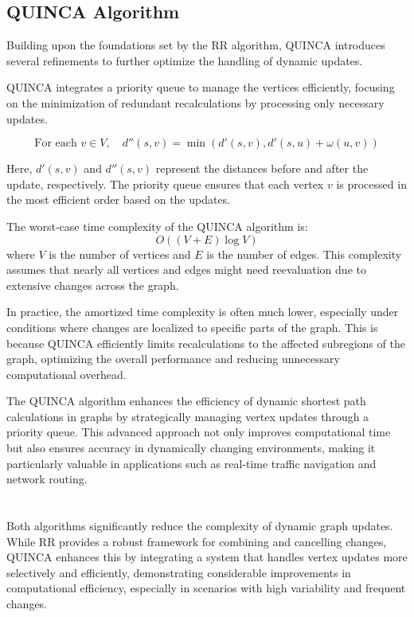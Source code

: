 \documentclass[conference]{IEEEtran}
\begin{document}
\subsection{QUINCA Algorithm}
Building upon the foundations set by the RR algorithm, QUINCA \cite{Slobbe2016FasterIA} introduces several refinements to further optimize the handling of dynamic updates.

QUINCA integrates a priority queue to manage the vertices efficiently, focusing on the minimization of redundant recalculations by processing only necessary updates.

\[
\text{For each } v \in V, \quad d''(s, v) = \min(d'(s, v), d'(s, u) + \omega(u, v))
\]

Here, \( d'(s, v) \) and \( d''(s, v) \) represent the distances before and after the update, respectively. The priority queue ensures that each vertex \( v \) is processed in the most efficient order based on the updates.

The worst-case time complexity of the QUINCA algorithm is:
\[
O((V + E) \log V)
\]
where \(V\) is the number of vertices and \(E\) is the number of edges. This complexity assumes that nearly all vertices and edges might need reevaluation due to extensive changes across the graph.

In practice, the amortized time complexity is often much lower, especially under conditions where changes are localized to specific parts of the graph. This is because QUINCA efficiently limits recalculations to the affected subregions of the graph, optimizing the overall performance and reducing unnecessary computational overhead.

The QUINCA algorithm enhances the efficiency of dynamic shortest path calculations in graphs by strategically managing vertex updates through a priority queue. This advanced approach not only improves computational time but also ensures accuracy in dynamically changing environments, making it particularly valuable in applications such as real-time traffic navigation and network routing.

\section*{}
Both algorithms significantly reduce the complexity of dynamic graph updates. While RR provides a robust framework for combining and cancelling changes, QUINCA enhances this by integrating a system that handles vertex updates more selectively and efficiently, demonstrating considerable improvements in computational efficiency, especially in scenarios with high variability and frequent changes.
\end{document}
